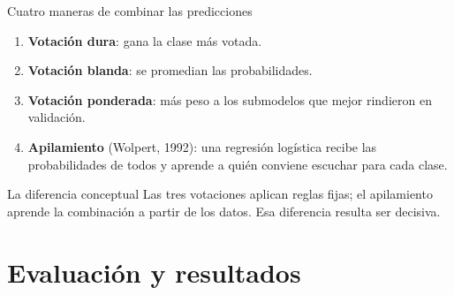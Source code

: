 \documentclass[aspectratio=169,10pt]{beamer}
\begin{document}
\begin{frame}{Cuatro maneras de combinar las predicciones}
  \small
  \begin{enumerate}
    \item \textbf{Votación dura}: gana la clase más votada.
    \item \textbf{Votación blanda}: se promedian las probabilidades.
    \item \textbf{Votación ponderada}: más peso a los submodelos que mejor
          rindieron en validación.
    \item \textbf{Apilamiento} (Wolpert, 1992): una regresión logística
          recibe las probabilidades de todos y \alert{aprende} a quién
          conviene escuchar para cada clase.
  \end{enumerate}

  \vfill
  \begin{block}{La diferencia conceptual}
    Las tres votaciones aplican \alert{reglas fijas}; el apilamiento
    \alert{aprende la combinación a partir de los datos}. Esa diferencia
    resulta ser decisiva.
  \end{block}
\end{frame}

\section{Evaluación y resultados}
\end{document}
